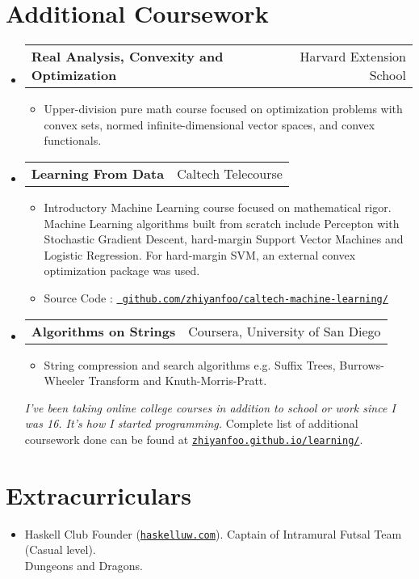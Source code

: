 \documentclass[letterpaper,11pt]{article}
\makeatletter
\newcommand{\courseSubheading}[2]{
  \vspace{-1pt}\item
    \begin{tabular*}{0.97\textwidth}{l@{\extracolsep{\fill}}r}
      \textbf{#1} & #2 \\
    \end{tabular*}\vspace{-5pt}
}
\newcommand{\courseItem}[1]{
  \item\small{
    {#1 \vspace{-2pt}}
  }
}
\newcommand{\resumeSubHeadingListStart}{\begin{itemize}[leftmargin=*, label={}]}
\newcommand{\resumeSubHeadingListEnd}{\end{itemize}}
\newcommand{\resumeItemListStart}{\begin{itemize}[label={}]}
\newcommand{\resumeItemListEnd}{\end{itemize}\vspace{-5pt}}
\makeatother
\begin{document}
\section{Additional Coursework}
 \resumeSubHeadingListStart
    \courseSubheading
      {Real Analysis, Convexity and Optimization}{Harvard Extension School}
      \resumeItemListStart
        \courseItem
          {Upper-division pure math course focused on optimization problems
            with convex sets, normed infinite-dimensional vector spaces, and
            convex functionals.}
      \resumeItemListEnd
    \courseSubheading
      {Learning From Data}{Caltech Telecourse}
      \resumeItemListStart
        \courseItem
          {Introductory Machine Learning course focused on mathematical
          rigor. Machine Learning algorithms built from scratch include
            Percepton with Stochastic Gradient Descent, hard-margin Support
            Vector Machines and Logistic Regression. For hard-margin SVM, an
            external convex optimization package was used.}
        \courseItem {Source Code :
    \href{https://github.com/zhiyanfoo/caltech-machine-learning/}{\tt
    github.com/zhiyanfoo/caltech-machine-learning/}}
      \resumeItemListEnd
    \courseSubheading
      {Algorithms on Strings}{Coursera, University of San Diego}
      \resumeItemListStart
        \courseItem
          {String compression and search algorithms  e.g. Suffix
            Trees, Burrows-Wheeler Transform and Knuth-Morris-Pratt.}
      \resumeItemListEnd
\vspace{5pt}
\emph{I've been taking online college courses in addition to school or work since I was 16.
 It's how I started programming.} Complete list of additional coursework done can be found at
\href{https://zhiyanfoo.github.io/learning/}{\tt zhiyanfoo.github.io/learning/}. 
 \resumeSubHeadingListEnd

\section{Extracurriculars}
 \resumeSubHeadingListStart
   \item{
       Haskell Club Founder (\href{http://haskelluw.com}{\tt haskelluw.com}). Captain of
       Intramural Futsal Team (Casual level). \\ Dungeons and Dragons.
   }

 \resumeSubHeadingListEnd
\end{document}
